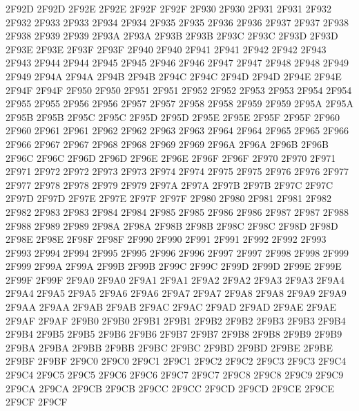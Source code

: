 \ID 2F92D 2F92D
\ID 2F92E 2F92E
\ID 2F92F 2F92F
\ID 2F930 2F930
\ID 2F931 2F931
\ID 2F932 2F932
\ID 2F933 2F933
\ID 2F934 2F934
\ID 2F935 2F935
\ID 2F936 2F936
\ID 2F937 2F937
\ID 2F938 2F938
\ID 2F939 2F939
\ID 2F93A 2F93A
\ID 2F93B 2F93B
\ID 2F93C 2F93C
\ID 2F93D 2F93D
\ID 2F93E 2F93E
\ID 2F93F 2F93F
\ID 2F940 2F940
\ID 2F941 2F941
\ID 2F942 2F942
\ID 2F943 2F943
\ID 2F944 2F944
\ID 2F945 2F945
\ID 2F946 2F946
\ID 2F947 2F947
\ID 2F948 2F948
\ID 2F949 2F949
\ID 2F94A 2F94A
\ID 2F94B 2F94B
\ID 2F94C 2F94C
\ID 2F94D 2F94D
\ID 2F94E 2F94E
\ID 2F94F 2F94F
\ID 2F950 2F950
\ID 2F951 2F951
\ID 2F952 2F952
\ID 2F953 2F953
\ID 2F954 2F954
\ID 2F955 2F955
\ID 2F956 2F956
\ID 2F957 2F957
\ID 2F958 2F958
\ID 2F959 2F959
\ID 2F95A 2F95A
\ID 2F95B 2F95B
\ID 2F95C 2F95C
\ID 2F95D 2F95D
\ID 2F95E 2F95E
\ID 2F95F 2F95F
\ID 2F960 2F960
\ID 2F961 2F961
\ID 2F962 2F962
\ID 2F963 2F963
\ID 2F964 2F964
\ID 2F965 2F965
\ID 2F966 2F966
\ID 2F967 2F967
\ID 2F968 2F968
\ID 2F969 2F969
\ID 2F96A 2F96A
\ID 2F96B 2F96B
\ID 2F96C 2F96C
\ID 2F96D 2F96D
\ID 2F96E 2F96E
\ID 2F96F 2F96F
\ID 2F970 2F970
\ID 2F971 2F971
\ID 2F972 2F972
\ID 2F973 2F973
\ID 2F974 2F974
\ID 2F975 2F975
\ID 2F976 2F976
\ID 2F977 2F977
\ID 2F978 2F978
\ID 2F979 2F979
\ID 2F97A 2F97A
\ID 2F97B 2F97B
\ID 2F97C 2F97C
\ID 2F97D 2F97D
\ID 2F97E 2F97E
\ID 2F97F 2F97F
\ID 2F980 2F980
\ID 2F981 2F981
\ID 2F982 2F982
\ID 2F983 2F983
\ID 2F984 2F984
\ID 2F985 2F985
\ID 2F986 2F986
\ID 2F987 2F987
\ID 2F988 2F988
\ID 2F989 2F989
\ID 2F98A 2F98A
\ID 2F98B 2F98B
\ID 2F98C 2F98C
\ID 2F98D 2F98D
\ID 2F98E 2F98E
\ID 2F98F 2F98F
\ID 2F990 2F990
\ID 2F991 2F991
\ID 2F992 2F992
\ID 2F993 2F993
\ID 2F994 2F994
\ID 2F995 2F995
\ID 2F996 2F996
\ID 2F997 2F997
\ID 2F998 2F998
\ID 2F999 2F999
\ID 2F99A 2F99A
\ID 2F99B 2F99B
\ID 2F99C 2F99C
\ID 2F99D 2F99D
\ID 2F99E 2F99E
\ID 2F99F 2F99F
\ID 2F9A0 2F9A0
\ID 2F9A1 2F9A1
\ID 2F9A2 2F9A2
\ID 2F9A3 2F9A3
\ID 2F9A4 2F9A4
\ID 2F9A5 2F9A5
\ID 2F9A6 2F9A6
\ID 2F9A7 2F9A7
\ID 2F9A8 2F9A8
\ID 2F9A9 2F9A9
\ID 2F9AA 2F9AA
\ID 2F9AB 2F9AB
\ID 2F9AC 2F9AC
\ID 2F9AD 2F9AD
\ID 2F9AE 2F9AE
\ID 2F9AF 2F9AF
\ID 2F9B0 2F9B0
\ID 2F9B1 2F9B1
\ID 2F9B2 2F9B2
\ID 2F9B3 2F9B3
\ID 2F9B4 2F9B4
\ID 2F9B5 2F9B5
\ID 2F9B6 2F9B6
\ID 2F9B7 2F9B7
\ID 2F9B8 2F9B8
\ID 2F9B9 2F9B9
\ID 2F9BA 2F9BA
\ID 2F9BB 2F9BB
\ID 2F9BC 2F9BC
\ID 2F9BD 2F9BD
\ID 2F9BE 2F9BE
\ID 2F9BF 2F9BF
\ID 2F9C0 2F9C0
\ID 2F9C1 2F9C1
\ID 2F9C2 2F9C2
\ID 2F9C3 2F9C3
\ID 2F9C4 2F9C4
\ID 2F9C5 2F9C5
\ID 2F9C6 2F9C6
\ID 2F9C7 2F9C7
\ID 2F9C8 2F9C8
\ID 2F9C9 2F9C9
\ID 2F9CA 2F9CA
\ID 2F9CB 2F9CB
\ID 2F9CC 2F9CC
\ID 2F9CD 2F9CD
\ID 2F9CE 2F9CE
\ID 2F9CF 2F9CF
